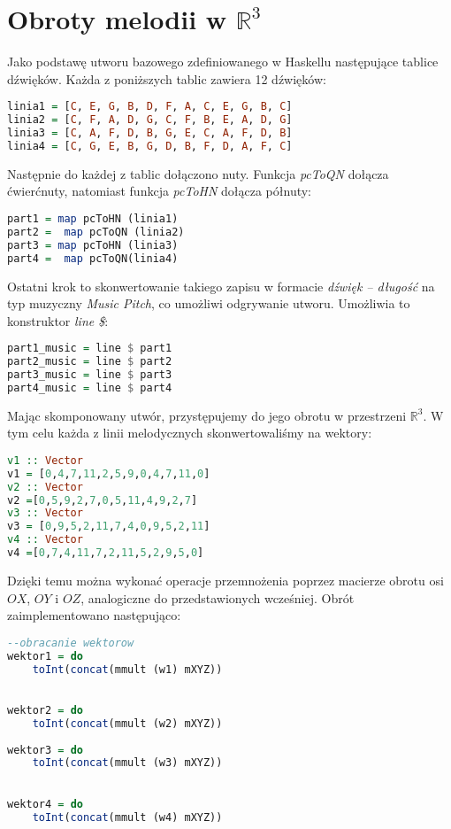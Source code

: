 
\section{Obroty melodii w \texorpdfstring{$\mathbb{R}^{3}$}{R3}}

Jako podstawę utworu bazowego zdefiniowanego w Haskellu następujące tablice dźwięków. Każda z poniższych tablic zawiera 12 dźwięków:
\begin{lstlisting}[language = Haskell]
linia1 = [C, E, G, B, D, F, A, C, E, G, B, C] 
linia2 = [C, F, A, D, G, C, F, B, E, A, D, G] 
linia3 = [C, A, F, D, B, G, E, C, A, F, D, B]
linia4 = [C, G, E, B, G, D, B, F, D, A, F, C] 
\end{lstlisting}
Następnie do każdej z tablic dołączono nuty. Funkcja \textit{pcToQN} dołącza ćwierćnuty, natomiast funkcja \textit{pcToHN} dołącza półnuty:
\begin{lstlisting}[language = Haskell]
part1 = map pcToHN (linia1)
part2 =  map pcToQN (linia2)
part3 = map pcToHN (linia3)
part4 =  map pcToQN(linia4)
\end{lstlisting}
Ostatni krok to skonwertowanie takiego zapisu w formacie \textit{dźwięk -- długość} na typ muzyczny \textit{Music Pitch}, co umożliwi odgrywanie utworu. Umożliwia to konstruktor \textit{line \$}:
\begin{lstlisting}[language = Haskell]
part1_music = line $ part1
part2_music = line $ part2
part3_music = line $ part3
part4_music = line $ part4
\end{lstlisting}
Mając skomponowany utwór, przystępujemy do jego obrotu w przestrzeni $\mathbb{R}^{3}$. W tym celu każda z linii melodycznych skonwertowaliśmy na wektory:
\begin{lstlisting}[language = Haskell]
v1 :: Vector
v1 = [0,4,7,11,2,5,9,0,4,7,11,0]
v2 :: Vector
v2 =[0,5,9,2,7,0,5,11,4,9,2,7]
v3 :: Vector
v3 = [0,9,5,2,11,7,4,0,9,5,2,11]
v4 :: Vector
v4 =[0,7,4,11,7,2,11,5,2,9,5,0]
\end{lstlisting}
Dzięki temu można wykonać operacje przemnożenia poprzez macierze obrotu osi $OX$, $OY$ i $OZ$, analogiczne do przedstawionych wcześniej.
Obrót zaimplementowano następująco:
\begin{lstlisting}[language = Haskell]
--obracanie wektorow
wektor1 = do
    toInt(concat(mmult (w1) mXYZ))
    

wektor2 = do
    toInt(concat(mmult (w2) mXYZ))
    
wektor3 = do
    toInt(concat(mmult (w3) mXYZ))
    

wektor4 = do
    toInt(concat(mmult (w4) mXYZ))
\end{lstlisting}

